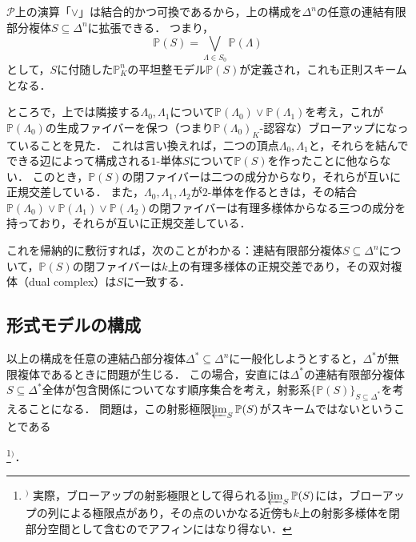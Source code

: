 \documentclass[a4paper,12pt, dvipdfmx]{jsbook}
\def\P{\mathbb{P}}
\theoremstyle{plain}
\theoremstyle{definition}
\newcounter{chushaku}
\def\chu#1{\addtocounter{chushaku}{1}\footnote[\value{chushaku}]{${}^)$ #1}${}^)$}
\begin{document}
$\mathcal{P}$上の演算「$\vee$」は結合的かつ可換であるから，上の構成を$\Delta^n$の任意の連結有限部分複体$S\subseteq\Delta^n$に拡張できる．
つまり，
$$
\P(S)=\bigvee_{\Lambda\in S_0}\P(\Lambda)
$$
として，$S$に付随した$\P^n_K$の平坦整モデル$\P(S)$が定義され，これも正則スキームとなる．

ところで，上では隣接する$\Lambda_0,\Lambda_1$について$\P(\Lambda_0)\vee\P(\Lambda_1)$を考え，これが$\P(\Lambda_0)$の生成ファイバーを保つ（つまり$\P(\Lambda_0)_K$-認容な）ブローアップになっていることを見た．
これは言い換えれば，二つの頂点$\Lambda_0,\Lambda_1$と，それらを結んでできる辺によって構成される$1$-単体$S$について$\P(S)$を作ったことに他ならない．
このとき，$\P(S)$の閉ファイバーは二つの成分からなり，それらが互いに正規交差している．
また，$\Lambda_0,\Lambda_1,\Lambda_2$が$2$-単体を作るときは，その結合$\P(\Lambda_0)\vee\P(\Lambda_1)\vee\P(\Lambda_2)$の閉ファイバーは有理多様体からなる三つの成分を持っており，それらが互いに正規交差している．

これを帰納的に敷衍すれば，次のことがわかる：連結有限部分複体$S\subseteq\Delta^n$について，$\P(S)$の閉ファイバーは$k$上の有理多様体の正規交差であり，その双対複体（dual complex）は$S$に一致する．

\subsection{形式モデルの構成}\label{sub-formalDrinfeld}
以上の構成を任意の連結凸部分複体$\Delta^{\ast}\subseteq\Delta^n$に一般化しようとすると，$\Delta^{\ast}$が無限複体であるときに問題が生じる．
この場合，安直には$\Delta^{\ast}$の連結有限部分複体$S\subseteq\Delta^{\ast}$全体が包含関係についてなす順序集合を考え，射影系$\{\P(S)\}_{S\subseteq\Delta^{\ast}}$を考えることになる．
問題は，この射影極限$\varprojlim_{S}\P(S)$がスキームではないということである\chu{実際，ブローアップの射影極限として得られる$\varprojlim_{S}\P(S)$には，ブローアップの列による極限点があり，その点のいかなる近傍も$k$上の射影多様体を閉部分空間として含むのでアフィンにはなり得ない．}．
\end{document}
